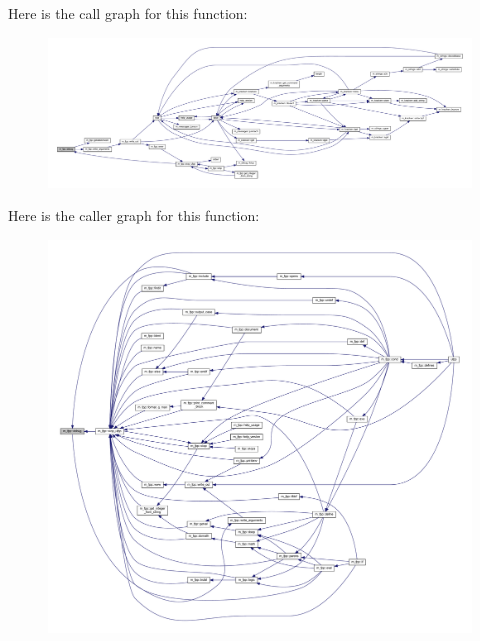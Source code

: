 Here is the call graph for this function\+:
\nopagebreak
\begin{figure}[H]
\begin{center}
\leavevmode
\includegraphics[width=350pt]{namespacem__fpp_a6044fedc32afb4caa50f83a17d324e5b_cgraph}
\end{center}
\end{figure}
Here is the caller graph for this function\+:
\nopagebreak
\begin{figure}[H]
\begin{center}
\leavevmode
\includegraphics[width=350pt]{namespacem__fpp_a6044fedc32afb4caa50f83a17d324e5b_icgraph}
\end{center}
\end{figure}
\mbox{\label{namespacem__fpp_af80169d1e05b926eed9d4dbe10963084}} 
